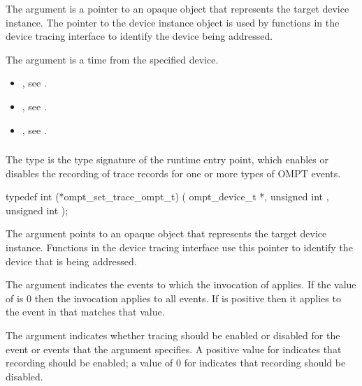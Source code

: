 \argdesc
The  argument is a pointer to an opaque object that
represents the target device instance. The pointer to the device
instance object is used by functions in the device tracing interface
to identify the device being addressed.

The  argument is a time from the specified device.

\crossreferences
\begin{itemize}
\item {}, see .

\item {}, see .

\item {}, see .
\end{itemize}



\subsubsection{}
\label{sec:ompt_set_trace_ompt_t}

\summary
The  type is the type signature of the 
 runtime entry point, which enables or disables 
the recording of trace records for one or more types of OMPT events.

\format
\begin{ccppspecific}
\begin{omptInquiry}
typedef int (*ompt_set_trace_ompt_t) (
  ompt_device_t *,
  unsigned int ,
  unsigned int 
);
\end{omptInquiry}
\end{ccppspecific}

\argdesc
The  argument points to an opaque object that represents
the target device instance. Functions in the device tracing interface
use this pointer to identify the device that is being addressed.

The  argument indicates the events to which the invocation of 
 applies. If the value of  is 0 then
the invocation applies to all events. If  is positive then it applies 
to the event in  that matches that value.

The  argument indicates whether tracing should be enabled 
or disabled for the event or events that the  argument specifies. 
A positive value for  indicates that recording should be enabled; 
a value of 0 for  indicates that recording should be disabled.

